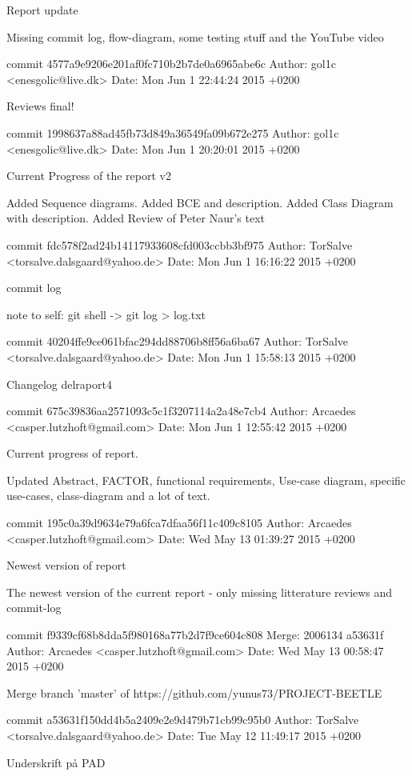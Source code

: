 \documentclass[12pt,a4paper]{article}
\begin{document}
Report update

Missing commit log, flow-diagram, some testing stuff and the YouTube
video

commit 4577a9e9206e201af0fc710b2b7de0a6965abe6c
Author: gol1c <enesgolic@live.dk>
Date:   Mon Jun 1 22:44:24 2015 +0200

Reviews final!

commit 1998637a88ad45fb73d849a36549fa09b672e275
Author: gol1c <enesgolic@live.dk>
Date:   Mon Jun 1 20:20:01 2015 +0200

Current Progress of the report v2

Added Sequence diagrams. Added BCE and description. Added Class Diagram
with description.
Added Review of Peter Naur's text

commit fdc578f2ad24b14117933608cfd003ccbb3bf975
Author: TorSalve <torsalve.dalsgaard@yahoo.de>
Date:   Mon Jun 1 16:16:22 2015 +0200

commit log

note to self: git shell ->
git log > log.txt

commit 40204ffe9ce061bfac294dd88706b8ff56a6ba67
Author: TorSalve <torsalve.dalsgaard@yahoo.de>
Date:   Mon Jun 1 15:58:13 2015 +0200

Changelog delraport4

commit 675c39836aa2571093c5c1f3207114a2a48e7cb4
Author: Arcaedes <casper.lutzhoft@gmail.com>
Date:   Mon Jun 1 12:55:42 2015 +0200

Current progress of report.

Updated Abstract, FACTOR, functional requirements, Use-case diagram,
specific use-cases, class-diagram and a lot of text.

commit 195c0a39d9634e79a6fca7dfaa56f11c409c8105
Author: Arcaedes <casper.lutzhoft@gmail.com>
Date:   Wed May 13 01:39:27 2015 +0200

Newest version of report

The newest version of the current report - only missing litterature
reviews and commit-log

commit f9339cf68b8dda5f980168a77b2d7f9ce604c808
Merge: 2006134 a53631f
Author: Arcaedes <casper.lutzhoft@gmail.com>
Date:   Wed May 13 00:58:47 2015 +0200

Merge branch 'master' of https://github.com/yunus73/PROJECT-BEETLE

commit a53631f150dd4b5a2409e2e9d479b71cb99c95b0
Author: TorSalve <torsalve.dalsgaard@yahoo.de>
Date:   Tue May 12 11:49:17 2015 +0200

Underskrift på PAD
\end{document}
